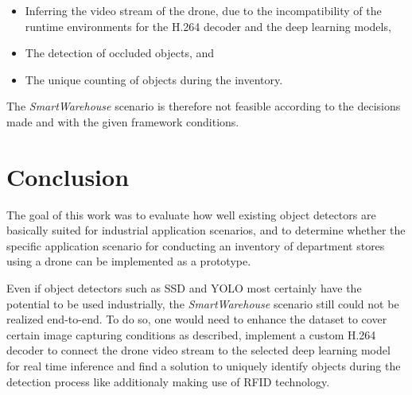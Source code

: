 \documentclass[a4paper, 10pt, journal]{wissarbIEEE}      %
\begin{document}
\begin{itemize}
	\item Inferring the video stream of the drone, due to the incompatibility of the runtime environments for the H.264 decoder and the deep learning models,
	\item The detection of occluded objects, and
	\item The unique counting of objects during the inventory.
\end{itemize}

The \textit{SmartWarehouse} scenario is therefore not feasible according to the decisions made and with the given framework conditions.

\section{Conclusion} \label{conclusion}

The goal of this work was to evaluate how well existing object detectors are basically suited for industrial application scenarios, and to determine whether the specific application scenario for conducting an inventory of department stores using a drone can be implemented as a prototype. 

Even if object detectors such as SSD and YOLO most certainly have the potential to be used industrially, the \textit{SmartWarehouse} scenario still could not be realized end-to-end. To do so, one would need to enhance the dataset to cover certain image capturing conditions as described, implement a custom H.264 decoder to connect the drone video stream to the selected deep learning model for real time inference and find a solution to uniquely identify objects during the detection process like additionaly making use of RFID technology. 


\end{document}
